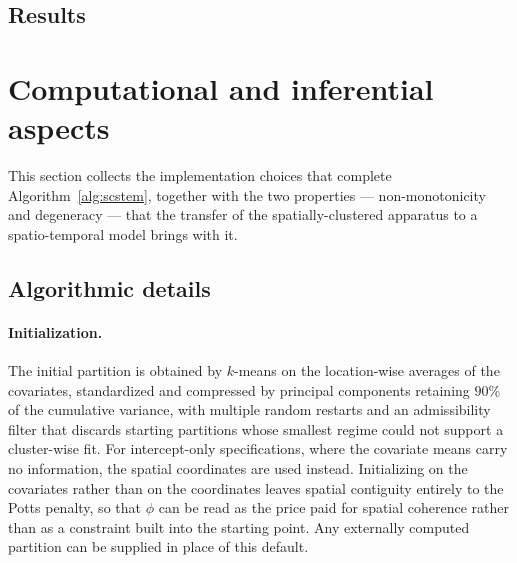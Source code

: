 \subsection{Results}\label{sec3:results}


\section{Computational and inferential aspects}\label{sec:compinf}

This section collects the implementation choices that complete Algorithm~\ref{alg:scstem}, together with the two properties --- non-monotonicity and degeneracy --- that the transfer of the spatially-clustered apparatus to a spatio-temporal model brings with it.

\subsection{Algorithmic details}\label{sec:algdetails}

\paragraph{Initialization.} The initial partition is obtained by $k$-means on the location-wise averages of the covariates, standardized and compressed by principal components retaining $90\%$ of the cumulative variance, with multiple random restarts and an admissibility filter that discards starting partitions whose smallest regime could not support a cluster-wise fit. For intercept-only specifications, where the covariate means carry no information, the spatial coordinates are used instead. Initializing on the covariates rather than on the coordinates leaves spatial contiguity entirely to the Potts penalty, so that $\phi$ can be read as the price paid for spatial coherence rather than as a constraint built into the starting point. Any externally computed partition can be supplied in place of this default.

